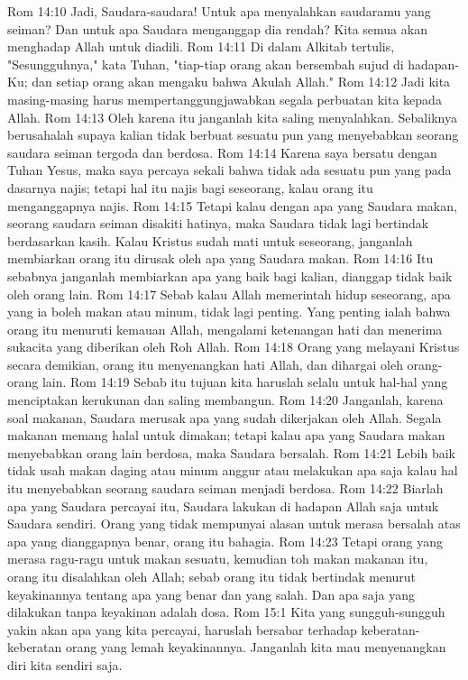 Rom 14:10  Jadi, Saudara-saudara! Untuk apa menyalahkan saudaramu yang seiman? Dan untuk apa Saudara menganggap dia rendah? Kita semua akan menghadap Allah untuk diadili.
Rom 14:11  Di dalam Alkitab tertulis, "Sesungguhnya," kata Tuhan, "tiap-tiap orang akan bersembah sujud di hadapan-Ku; dan setiap orang akan mengaku bahwa Akulah Allah."
Rom 14:12  Jadi kita masing-masing harus mempertanggungjawabkan segala perbuatan kita kepada Allah.
Rom 14:13  Oleh karena itu janganlah kita saling menyalahkan. Sebaliknya berusahalah supaya kalian tidak berbuat sesuatu pun yang menyebabkan seorang saudara seiman tergoda dan berdosa.
Rom 14:14  Karena saya bersatu dengan Tuhan Yesus, maka saya percaya sekali bahwa tidak ada sesuatu pun yang pada dasarnya najis; tetapi hal itu najis bagi seseorang, kalau orang itu menganggapnya najis.
Rom 14:15  Tetapi kalau dengan apa yang Saudara makan, seorang saudara seiman disakiti hatinya, maka Saudara tidak lagi bertindak berdasarkan kasih. Kalau Kristus sudah mati untuk seseorang, janganlah membiarkan orang itu dirusak oleh apa yang Saudara makan.
Rom 14:16  Itu sebabnya janganlah membiarkan apa yang baik bagi kalian, dianggap tidak baik oleh orang lain.
Rom 14:17  Sebab kalau Allah memerintah hidup seseorang, apa yang ia boleh makan atau minum, tidak lagi penting. Yang penting ialah bahwa orang itu menuruti kemauan Allah, mengalami ketenangan hati dan menerima sukacita yang diberikan oleh Roh Allah.
Rom 14:18  Orang yang melayani Kristus secara demikian, orang itu menyenangkan hati Allah, dan dihargai oleh orang-orang lain.
Rom 14:19  Sebab itu tujuan kita haruslah selalu untuk hal-hal yang menciptakan kerukunan dan saling membangun.
Rom 14:20  Janganlah, karena soal makanan, Saudara merusak apa yang sudah dikerjakan oleh Allah. Segala makanan memang halal untuk dimakan; tetapi kalau apa yang Saudara makan menyebabkan orang lain berdosa, maka Saudara bersalah.
Rom 14:21  Lebih baik tidak usah makan daging atau minum anggur atau melakukan apa saja kalau hal itu menyebabkan seorang saudara seiman menjadi berdosa.
Rom 14:22  Biarlah apa yang Saudara percayai itu, Saudara lakukan di hadapan Allah saja untuk Saudara sendiri. Orang yang tidak mempunyai alasan untuk merasa bersalah atas apa yang dianggapnya benar, orang itu bahagia.
Rom 14:23  Tetapi orang yang merasa ragu-ragu untuk makan sesuatu, kemudian toh makan makanan itu, orang itu disalahkan oleh Allah; sebab orang itu tidak bertindak menurut keyakinannya tentang apa yang benar dan yang salah. Dan apa saja yang dilakukan tanpa keyakinan adalah dosa.
Rom 15:1  Kita yang sungguh-sungguh yakin akan apa yang kita percayai, haruslah bersabar terhadap keberatan-keberatan orang yang lemah keyakinannya. Janganlah kita mau menyenangkan diri kita sendiri saja.
